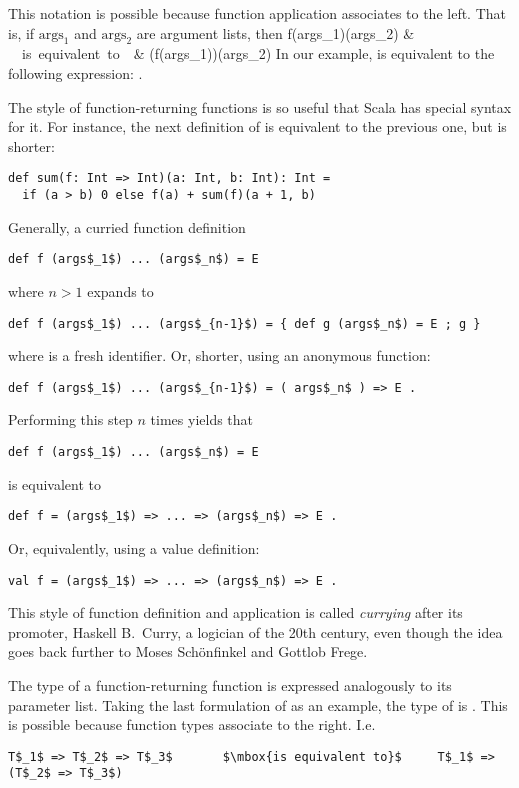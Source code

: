 This notation is possible because function application associates to the left.
That is, if $\mbox{args}_1$ and $\mbox{args}_2$ are argument lists, then 
f(\mbox{args}_1)(\mbox{args}_2) & \ \ \mbox{is equivalent to}\ \ & (f(\mbox{args}_1))(\mbox{args}_2)
\eda
In our example,  is equivalent to the
following expression:
.

The style of function-returning functions is so useful that Scala has
special syntax for it. For instance, the next definition of 
is equivalent to the previous one, but is shorter:
\begin{lstlisting}
def sum(f: Int => Int)(a: Int, b: Int): Int =
  if (a > b) 0 else f(a) + sum(f)(a + 1, b)
\end{lstlisting}
Generally, a curried function definition 
\begin{lstlisting}
def f (args$_1$) ... (args$_n$) = E
\end{lstlisting}
where $n > 1$ expands to
\begin{lstlisting}
def f (args$_1$) ... (args$_{n-1}$) = { def g (args$_n$) = E ; g }
\end{lstlisting}
where  is a fresh identifier. Or, shorter, using an anonymous function:
\begin{lstlisting}
def f (args$_1$) ... (args$_{n-1}$) = ( args$_n$ ) => E .
\end{lstlisting}
Performing this step $n$ times yields that
\begin{lstlisting}
def f (args$_1$) ... (args$_n$) = E
\end{lstlisting}
is equivalent to
\begin{lstlisting}
def f = (args$_1$) => ... => (args$_n$) => E .
\end{lstlisting}
Or, equivalently, using a value definition:
\begin{lstlisting}
val f = (args$_1$) => ... => (args$_n$) => E .
\end{lstlisting}
This style of function definition and application is called {\em
currying} after its promoter, Haskell B.\ Curry, a logician of the
20th century, even though the idea goes back further to Moses
Sch\"onfinkel and Gottlob Frege.

The type of a function-returning function is expressed analogously to
its parameter list. Taking the last formulation of  as an example,
the type of  is .
This is possible because function types associate to the right. I.e.
\begin{lstlisting}
T$_1$ => T$_2$ => T$_3$       $\mbox{is equivalent to}$     T$_1$ => (T$_2$ => T$_3$)
\end{lstlisting}


